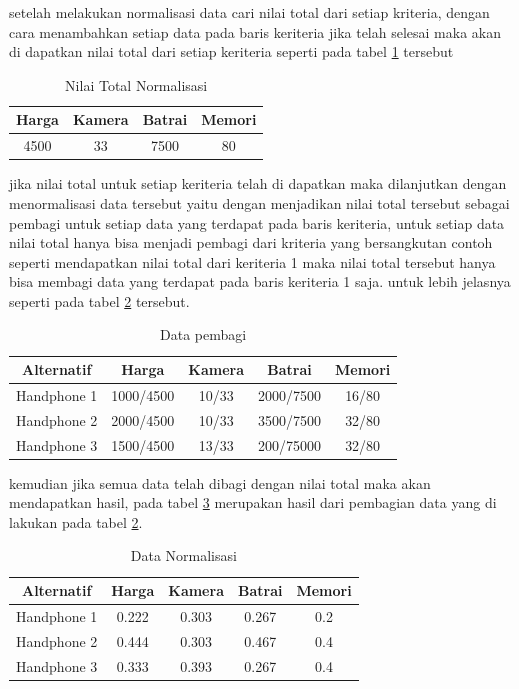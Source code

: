 setelah melakukan normalisasi data cari nilai total dari setiap kriteria, dengan cara menambahkan setiap data pada baris keriteria jika telah selesai maka akan di dapatkan nilai total dari setiap keriteria seperti pada tabel \ref{table5} tersebut

\begin{table}[h]
\caption{Nilai Total Normalisasi}
\centering
\begin{tabular}{|c|c|c|c|}
\hline
 Harga & Kamera & Batrai&Memori\\
\hline
4500 & 33 & 7500 &  80\\
\hline
\end{tabular}
\label{table5}
\end{table}

jika nilai total untuk setiap keriteria telah di dapatkan maka dilanjutkan dengan menormalisasi data tersebut yaitu dengan menjadikan nilai total tersebut sebagai pembagi untuk setiap data yang terdapat pada baris keriteria, untuk setiap data nilai total hanya bisa menjadi pembagi dari kriteria yang bersangkutan contoh seperti mendapatkan nilai total dari keriteria 1 maka nilai total tersebut hanya bisa membagi data yang terdapat pada baris keriteria 1 saja.
\pagebreak
untuk lebih jelasnya seperti pada tabel \ref{table6} tersebut.

\begin{table}[h]
\caption{Data pembagi}
\centering
\begin{tabular}{|c|c|c|c|c|}
\hline
Alternatif & Harga & Kamera & Batrai&Memori\\
\hline
Handphone 1 &1000/4500 & 10/33 & 2000/7500 &  16/80\\
\hline
Handphone 2 &2000/4500 & 10/33 & 3500/7500 &  32/80\\
\hline
Handphone 3 &1500/4500 & 13/33 & 200/75000 &  32/80\\
\hline

\end{tabular}
\label{table6}
\end{table}

kemudian jika semua data telah dibagi dengan nilai total maka akan mendapatkan hasil, pada tabel \ref{table7} merupakan hasil dari pembagian data yang di lakukan pada tabel \ref{table6}.

\begin{table}[h]
\caption{Data Normalisasi}
\centering
\begin{tabular}{|c|c|c|c|c|}
\hline
Alternatif & Harga & Kamera & Batrai&Memori\\
\hline
Handphone 1 &0.222 & 0.303 & 0.267 &  0.2\\
\hline
Handphone 2 &0.444 & 0.303 & 0.467 &  0.4\\
\hline
Handphone 3 &0.333 & 0.393 & 0.267 &  0.4\\
\hline

\end{tabular}
\label{table7}
\end{table}


